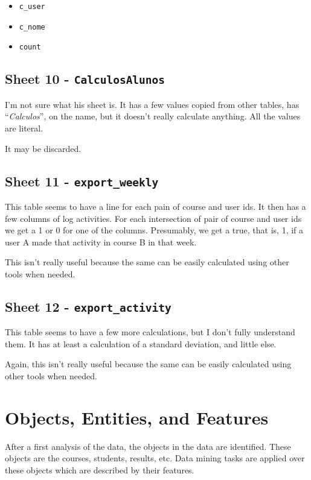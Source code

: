 \begin{itemize}
    \item \texttt{c\_user}
    \item \texttt{c\_nome}
    \item \texttt{count}
\end{itemize}

\subsection{Sheet 10 - \texttt{CalculosAlunos}}

I'm not sure what his sheet is. It has a few values copied from other tables,
has ``\textit{Calculos}'', on the name, but it doesn't really calculate
anything. All the values are literal.

It may be discarded.

\subsection{Sheet 11 - \texttt{export\_weekly}}

This table seems to have a line for each pain of course and user ids. It then
has a few columns of log activities. For each intersection of pair of course
and user ids we get a 1 or 0 for one of the columns. Presumably, we get a true,
that is, 1, if a user A made that activity in course B in that week.

This isn't really useful because the same can be easily calculated using other
tools when needed.

\subsection{Sheet 12 - \texttt{export\_activity}}

This table seems to have a few more calculations, but I don't fully understand
them. It has at least a calculation of a standard deviation, and little else.

Again, this isn't really useful because the same can be easily calculated using
other tools when needed.

\section{Objects, Entities, and Features}

After a first analysis of the data, the objects in the data are identified.
These objects are the courses, students, results, etc. Data mining tasks are
applied over these objects which are described by their features.

